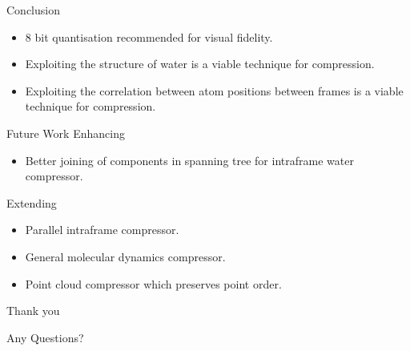 \documentclass{beamer}
\begin{document}
\begin{frame}{Conclusion}
\begin{itemize}
 \item 8 bit quantisation recommended for visual fidelity.
 \item Exploiting the structure of water is a viable technique for compression.
 \item Exploiting the correlation between atom positions between frames is a viable technique for compression.
\end{itemize}
\end{frame}

\begin{frame}{Future Work}
  Enhancing
  \begin{itemize}
  \item Better joining of components in spanning tree for intraframe water
    compressor.
  \end{itemize}
  Extending
  \begin{itemize}
  \item Parallel intraframe compressor.
  \item General molecular dynamics compressor.
  \item Point cloud compressor which preserves point order.
  \end{itemize}
\end{frame}

\begin{frame}{Thank you}
  \begin{center}
    Any Questions?
  \end{center}
\end{frame}
\end{document}
